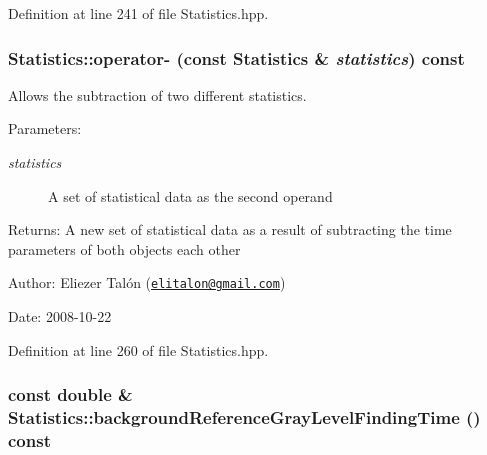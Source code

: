 Definition at line 241 of file Statistics.hpp.\hypertarget{class_statistics_529bed34d909d88440214d6983779043}{
\subsubsection[operator-]{ Statistics::operator- (const {\bf Statistics} \& {\em statistics}) const}}
\label{class_statistics_529bed34d909d88440214d6983779043}


Allows the subtraction of two different statistics. 

\begin{Desc}
\item[Parameters:]
\begin{description}
\item[{\em statistics}]A set of statistical data as the second operand\end{description}
\end{Desc}
\begin{Desc}
\item[Returns:]A new set of statistical data as a result of subtracting the time parameters of both objects each other\end{Desc}
\begin{Desc}
\item[Author:]Eliezer Talón (\href{mailto:elitalon@gmail.com}{\tt elitalon@gmail.com}) \end{Desc}
\begin{Desc}
\item[Date:]2008-10-22 \end{Desc}


Definition at line 260 of file Statistics.hpp.\hypertarget{class_statistics_d70a464a72d94c795097608e2a18550a}{
\subsubsection[backgroundReferenceGrayLevelFindingTime]{\setlength{\rightskip}{0pt plus 5cm}const double \& Statistics::backgroundReferenceGrayLevelFindingTime () const}}
\label{class_statistics_d70a464a72d94c795097608e2a18550a}


